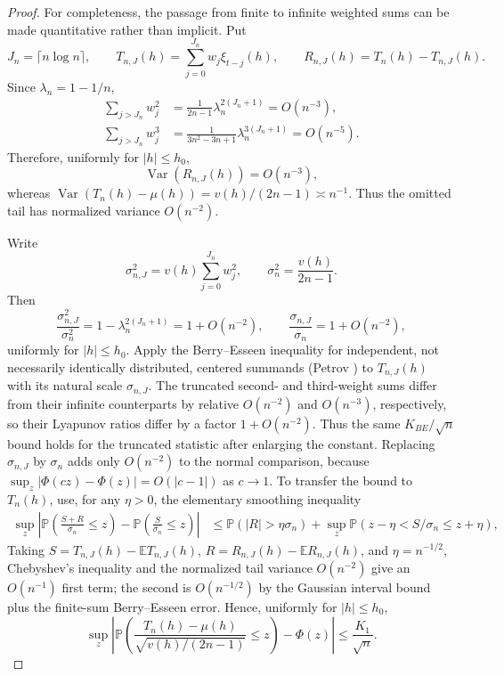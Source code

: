 \documentclass[11pt]{article}
\newcommand{\E}{\mathbb E}
\newcommand{\Var}{\operatorname{Var}}
\newcommand{\Prob}{\mathbb P}
\begin{document}
\begin{proof}
For completeness, the passage from finite to infinite weighted sums can be made quantitative rather than implicit. Put
\begin{equation}
J_n=\lceil n\log n\rceil,
\qquad
T_{n,J}(h)=\sum_{j=0}^{J_n}w_j\xi_{t-j}(h),
\qquad
R_{n,J}(h)=T_n(h)-T_{n,J}(h).
\end{equation}
Since $\lambda_n=1-1/n$,
\begin{align}
\sum_{j>J_n}w_j^2
&=\frac{1}{2n-1}\lambda_n^{2(J_n+1)}=O(n^{-3}),\\
\sum_{j>J_n}w_j^3
&=\frac{1}{3n^2-3n+1}\lambda_n^{3(J_n+1)}=O(n^{-5}).
\end{align}
Therefore, uniformly for $|h|\le h_0$,
\begin{equation}
\Var(R_{n,J}(h))=O(n^{-3}),
\end{equation}
whereas $\Var(T_n(h)-\mu(h))=v(h)/(2n-1)\asymp n^{-1}$. Thus the omitted tail has normalized variance $O(n^{-2})$.

Write
\begin{equation}
\sigma_{n,J}^2=v(h)\sum_{j=0}^{J_n}w_j^2,
\qquad
\sigma_n^2=\frac{v(h)}{2n-1}.
\end{equation}
Then
\begin{equation}
\frac{\sigma_{n,J}^2}{\sigma_n^2}
=1-\lambda_n^{2(J_n+1)}=1+O(n^{-2}),
\qquad
\frac{\sigma_{n,J}}{\sigma_n}=1+O(n^{-2}),
\end{equation}
uniformly for $|h|\le h_0$. Apply the Berry--Esseen inequality for independent, not necessarily identically distributed, centered summands (Petrov \cite{petrov1975}) to $T_{n,J}(h)$ with its natural scale $\sigma_{n,J}$. The truncated second- and third-weight sums differ from their infinite counterparts by relative $O(n^{-2})$ and $O(n^{-3})$, respectively, so their Lyapunov ratios differ by a factor $1+O(n^{-2})$. Thus the same $K_{BE}/\sqrt n$ bound holds for the truncated statistic after enlarging the constant. Replacing $\sigma_{n,J}$ by $\sigma_n$ adds only $O(n^{-2})$ to the normal comparison, because $\sup_z|\Phi(cz)-\Phi(z)|=O(|c-1|)$ as $c\to1$. To transfer the bound to $T_n(h)$, use, for any $\eta>0$, the elementary smoothing inequality
\begin{align}
\sup_z\left|\Prob\!\left(\frac{S+R}{\sigma_n}\le z\right)
-\Prob\!\left(\frac{S}{\sigma_n}\le z\right)\right|
&\le \Prob(|R|>\eta\sigma_n)
 +\sup_z\Prob(z-\eta< S/\sigma_n\le z+\eta),
\end{align}
Taking $S=T_{n,J}(h)-\E T_{n,J}(h)$, $R=R_{n,J}(h)-\E R_{n,J}(h)$, and $\eta=n^{-1/2}$, Chebyshev's inequality and the normalized tail variance $O(n^{-2})$ give an $O(n^{-1})$ first term; the second is $O(n^{-1/2})$ by the Gaussian interval bound plus the finite-sum Berry--Esseen error. Hence, uniformly for $|h|\le h_0$,
\begin{equation}
\boxed{
\sup_z\left|
\Prob\!\left(
\frac{T_n(h)-\mu(h)}{\sqrt{v(h)/(2n-1)}}\le z
\right)-\Phi(z)
\right|
\le \frac{K_1}{\sqrt n}.}
\end{equation}


\end{proof}
\end{document}
